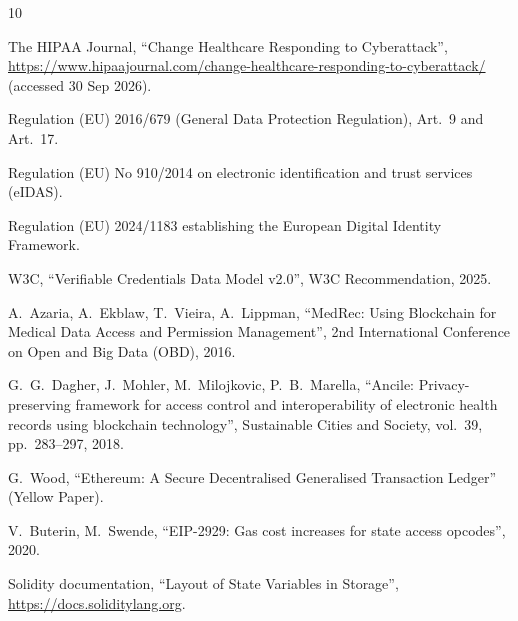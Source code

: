 \documentclass[10pt,a4paper]{article}
\begin{document}
\begin{singlespace}
\small
\begin{thebibliography}{10}

The HIPAA Journal, ``Change Healthcare Responding to Cyberattack'', \url{https://www.hipaajournal.com/change-healthcare-responding-to-cyberattack/} (accessed 30 Sep 2026).

Regulation (EU) 2016/679 (General Data Protection Regulation), Art.~9 and Art.~17.

Regulation (EU) No 910/2014 on electronic identification and trust services (eIDAS).

Regulation (EU) 2024/1183 establishing the European Digital Identity Framework.

W3C, ``Verifiable Credentials Data Model v2.0'', W3C Recommendation, 2025.

A.~Azaria, A.~Ekblaw, T.~Vieira, A.~Lippman, ``MedRec: Using Blockchain for Medical Data Access and Permission Management'', 2nd International Conference on Open and Big Data (OBD), 2016.

G.~G.~Dagher, J.~Mohler, M.~Milojkovic, P.~B.~Marella, ``Ancile: Privacy-preserving framework for access control and interoperability of electronic health records using blockchain technology'', Sustainable Cities and Society, vol.~39, pp.~283--297, 2018.

G.~Wood, ``Ethereum: A Secure Decentralised Generalised Transaction Ledger'' (Yellow Paper).

V.~Buterin, M.~Swende, ``EIP-2929: Gas cost increases for state access opcodes'', 2020.

Solidity documentation, ``Layout of State Variables in Storage'', \url{https://docs.soliditylang.org}.

\end{thebibliography}
\end{singlespace}
\end{document}
